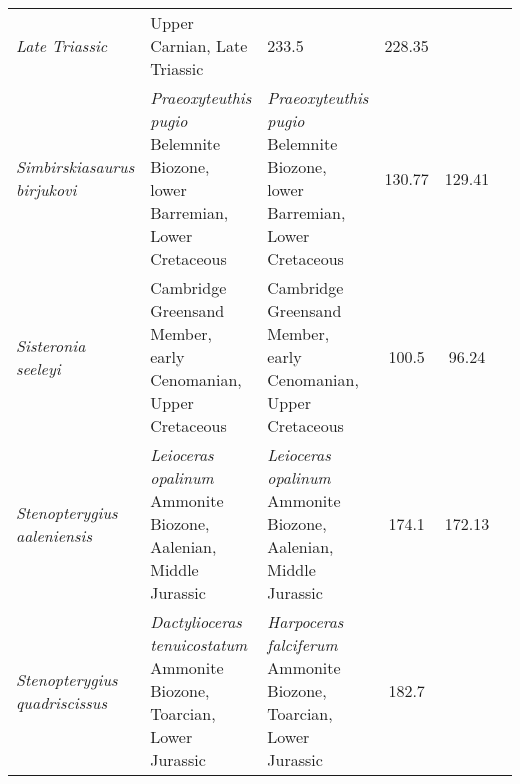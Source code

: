 \begin{longtabu}{>{\itshape}lXXSSl}
        Late Triassic
                                                             & Upper Carnian,
        Late Triassic
                                                             & 233.5
                                                             & 228.35
                                                             & \cite{Camp1980PAP} \\                       
	Simbirskiasaurus birjukovi                           &
        \emph{Praeoxyteuthis pugio} Belemnite Biozone, lower Barremian, Lower
        Cretaceous                                                   &
        \emph{Praeoxyteuthis pugio} Belemnite Biozone, lower Barremian, Lower
        Cretaceous                                                   & 130.77
                                                                     & 129.41
                                                                     &
                                                                     \cite{Fischer2014ZJLS} \\                   
	Sisteronia seeleyi                                   & Cambridge
        Greensand Member, early Cenomanian, Upper Cretaceous
                                                             & Cambridge
        Greensand Member, early Cenomanian, Upper Cretaceous
                                                             & 100.5
                                                             & 96.24
                                                             &
                                                             \cite{Fischer2014PO} \\                   
	Stenopterygius aaleniensis                           & \emph{Leioceras
        opalinum} Ammonite Biozone, Aalenian, Middle Jurassic
                                                             & \emph{Leioceras
        opalinum} Ammonite Biozone, Aalenian, Middle Jurassic
                                                             & 174.1
                                                             & 172.13
                                                             &
                                                             \cite{Maxwell2012PO} \\                   
	Stenopterygius quadriscissus                         &
        \emph{Dactylioceras tenuicostatum} Ammonite Biozone, Toarcian, Lower
        Jurassic                                                      &
        \emph{Harpoceras falciferum} Ammonite Biozone, Toarcian, Lower Jurassic
                                                                      & 182.7

\end{longtabu}
